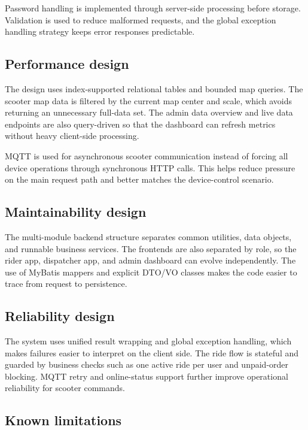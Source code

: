 \documentclass[12pt,a4paper]{article}
\begin{document}
Password handling is implemented through server-side processing before storage. Validation is used to reduce malformed requests, and the global exception handling strategy keeps error responses predictable.

\subsection{Performance design}

The design uses index-supported relational tables and bounded map queries. The scooter map data is filtered by the current map center and scale, which avoids returning an unnecessary full-data set. The admin data overview and live data endpoints are also query-driven so that the dashboard can refresh metrics without heavy client-side processing.

MQTT is used for asynchronous scooter communication instead of forcing all device operations through synchronous HTTP calls. This helps reduce pressure on the main request path and better matches the device-control scenario.

\subsection{Maintainability design}

The multi-module backend structure separates common utilities, data objects, and runnable business services. The frontends are also separated by role, so the rider app, dispatcher app, and admin dashboard can evolve independently. The use of MyBatis mappers and explicit DTO/VO classes makes the code easier to trace from request to persistence.

\subsection{Reliability design}

The system uses unified result wrapping and global exception handling, which makes failures easier to interpret on the client side. The ride flow is stateful and guarded by business checks such as one active ride per user and unpaid-order blocking. MQTT retry and online-status support further improve operational reliability for scooter commands.

\subsection{Known limitations}
\end{document}
